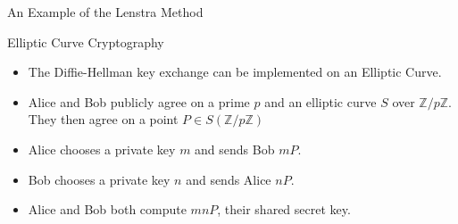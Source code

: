 \documentclass{beamer}
\begin{document}
	\begin{frame}{An Example of the Lenstra Method}
	
	\end{frame}
	
	\begin{frame}{Elliptic Curve Cryptography}
		\begin{itemize}
			\item The Diffie-Hellman key exchange can be implemented on an Elliptic Curve.
			\item Alice and Bob publicly agree on a prime $p$ and an elliptic curve $S$ over $\mathbb{Z}/p\mathbb{Z}$. They then agree on a point $P \in S(\mathbb{Z}/p\mathbb{Z})$
			\item Alice chooses a private key $m$ and sends Bob $mP$.
			\item Bob chooses a private key $n$ and sends Alice $nP$.
			\item Alice and Bob both compute $mnP$, their shared secret key.
		\end{itemize}
	\end{frame}
\end{document}
